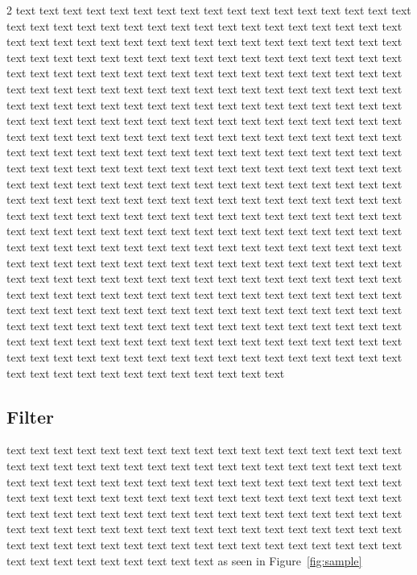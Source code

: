 \documentclass[letterpaper,10pt]{article}
\begin{document}
\begin{multicols}{2}
text text text text text text text text text text text text text text text text text text text text text text text text text text text text text text text text text text text text text text text text text text text text text text text text text text text text text text text text text text text text text text text text text text text text text text text text text text text text text text text text text text text text text text text text text text text text text text text text text text text text text text text text text text text text text text text text text text text text text text text text text text text text text text text text text text text text text text text text text text text text text text text text text text text text text text text text text text text text text text text text text text text text text text text text text text text text text text text text text text text text text text text text text text text text text text text text text text text text text text text text text text text text text text text text text text text text text text text text text text text text text text text text text text text text text text text text text text text text text text text text text text text text text text text text text text text text text text text text text text text text text text text text text text text text text text text text text text text text text text text text text text text text text text text text text text text text text text text text text text text text text text text text text text text text text text text text text text text text text text text text text text text text text text text text text text text text text text text text text text text text text text text text text text text text text text text text text text text text text text text text text text text text text text text text text text text text text text text text text text text text text text text text text text text text text text text text text text text text text text text text text text text 

\subsection{Filter}

text text text text text text text text text text text text text text text text text text text text text text text text text text text text text text text text text text text text text text text text text text text text text text text text text text text text text text text text text text text text text text text text text text text text text text text text text text text text text text text text text text text text text text text text text text text text text text text text text text text text text text text text text text text text text text text text text text text text text text text text text text text text text text text text as seen in Figure~\ref{fig:sample}


\end{multicols}
\end{document}
